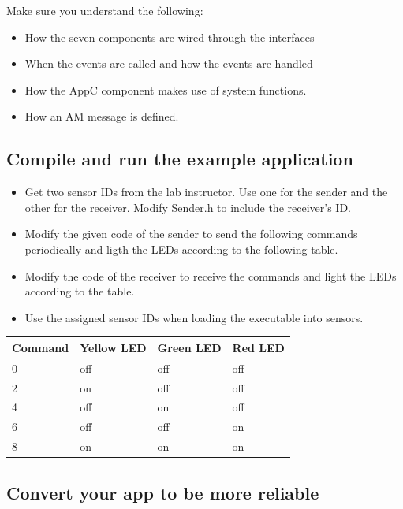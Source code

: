 \documentclass[letterpaper,12pt]{article}
\begin{document}
    Make sure you understand the following:
    \begin{itemize}
        \item How the seven components are wired through the interfaces
        \item When the events are called and how the events are handled
        \item How the AppC component makes use of system functions.
        \item How an AM message is defined.
    \end{itemize}

\subsection*{Compile and run the example application}
    \begin{itemize}
        \item Get two sensor IDs from the lab instructor. Use one for the sender and the other for the receiver. Modify Sender.h to include the receiver's ID.
        \item Modify the given code of the sender to send the following commands periodically and ligth the LEDs according to the following table.
        \item Modify the code of the receiver to receive the commands and light the LEDs according to the table.
        \item Use the assigned sensor IDs when loading the executable into sensors.
    \end{itemize}
    \begin{table}[htbp]
    \begin{center}
        \begin{tabular}{ |l|l|l|l| }
            \hline
            \textbf{Command} & \textbf{Yellow LED} & \textbf{Green LED} & \textbf{Red LED} \\ \hline
            0 & off & off & off \\ \hline
            2 & on & off & off \\ \hline
            4 & off & on & off \\ \hline
            6 & off & off & on \\ \hline
            8 & on & on & on \\ \hline
        \end{tabular}
    \end{center}
    \end{table}

\subsection*{Convert your app to be more reliable}
\end{document}
